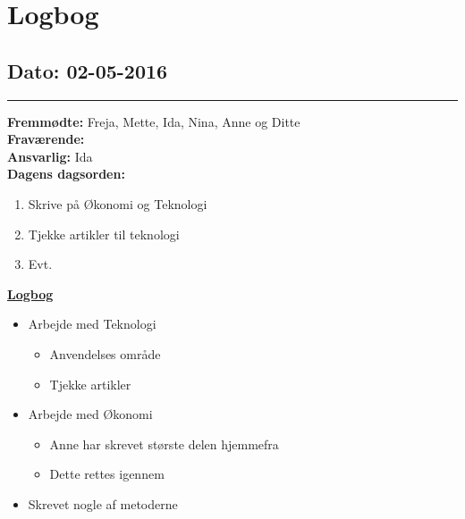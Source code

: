 \chapter{Logbog}
\section{Dato: 02-05-2016}
\hrule
\textbf{Fremmødte:} Freja, Mette, Ida, Nina, Anne og Ditte \\
\textbf{Fraværende: } \\
\textbf{Ansvarlig: } Ida \\
\textbf{Dagens dagsorden: }
\begin{enumerate}
	\item Skrive på Økonomi og Teknologi
	\item Tjekke artikler til teknologi
	\item Evt. 
\end{enumerate}


\underline{\textbf{Logbog}}
\begin{itemize}
\item Arbejde med Teknologi
\begin{itemize}
\item Anvendelses område
\item Tjekke artikler
\end{itemize}
\item Arbejde med Økonomi
\begin{itemize}
\item Anne har skrevet største delen hjemmefra
\item Dette rettes igennem
\end{itemize}
\item Skrevet nogle af metoderne
\end{itemize}

